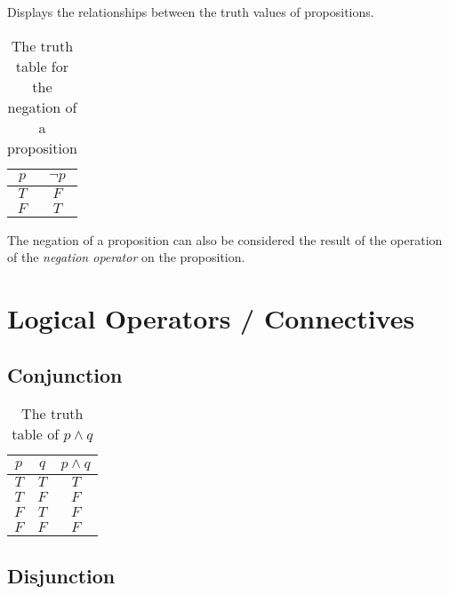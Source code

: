\documentclass[12pt letter]{report}
\begin{document}
 {
	Displays the relationships between the truth values of propositions.
}


\begin{table}[h!]
	\centering
	\begin{tabular}{|c|c|}
		\hline
		$p$ & $\neg p$ \\[0.5ex]
		\hline
		\hline
		$T$ & $F$      \\
		$F$ & $T$      \\
		\hline
	\end{tabular}
	\caption{The truth table for the negation of a proposition}
	\label{tab:1}
\end{table}

The negation of a proposition can also be considered the result of the operation of the \textit{negation operator} on
the proposition.

\section{Logical Operators / Connectives}

\subsection{Conjunction}

\begin{table}[h!]
	\caption{The truth table of $p \wedge q$}\label{tab:2}
	\begin{center}
		\begin{tabular}{|c c|c|}
			\hline
			$p$ & $q$ & $p \wedge q$ \\[0.5ex]
			\hline
			\hline
			$T$ & $T$ & $T$          \\
			$T$ & $F$ & $F$          \\
			$F$ & $T$ & $F$          \\
			$F$ & $F$ & $F$          \\
			\hline
		\end{tabular}
	\end{center}
\end{table}


\subsection{Disjunction}
\end{document}
